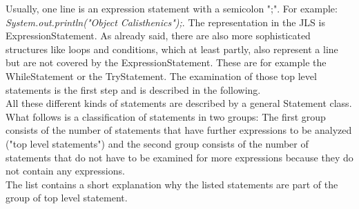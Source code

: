 Usually, one line is an expression statement with a semicolon ";". 
For example: \textit{System.out.println("Object Calisthenics");}. The representation in the \ac{JLS} is ExpressionStatement. As already said, there are also more sophisticated structures like loops and conditions, which at least partly, also represent a line but are not covered by the ExpressionStatement. These are for example the WhileStatement or the TryStatement. The examination of those top level statements is the first step and is described in the following.
\\

All these different kinds of statements are described by a general Statement class. What follows is a classification of statements in two groups: The first group consists of the number of statements that have further expressions to be analyzed ("top level statements") and the second group consists of the number of statements that do not have to be examined for more expressions because they do not contain any expressions. 
\\

The list contains a short explanation why the listed statements are part of the group of top level statement.
\\

